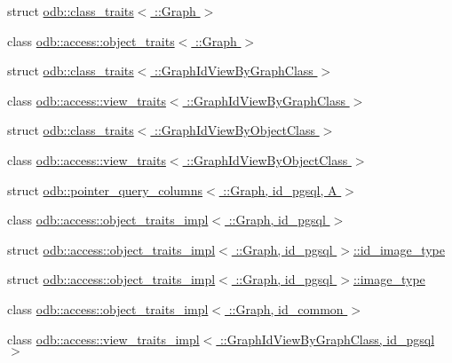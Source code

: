 \begin{DoxyCompactItemize}
\item 
struct \hyperlink{structodb_1_1class__traits_3_01_1_1_graph_01_4}{odb\+::class\+\_\+traits$<$ \+::\+Graph $>$}
\item 
class \hyperlink{classodb_1_1access_1_1object__traits_3_01_1_1_graph_01_4}{odb\+::access\+::object\+\_\+traits$<$ \+::\+Graph $>$}
\item 
struct \hyperlink{structodb_1_1class__traits_3_01_1_1_graph_id_view_by_graph_class_01_4}{odb\+::class\+\_\+traits$<$ \+::\+Graph\+Id\+View\+By\+Graph\+Class $>$}
\item 
class \hyperlink{classodb_1_1access_1_1view__traits_3_01_1_1_graph_id_view_by_graph_class_01_4}{odb\+::access\+::view\+\_\+traits$<$ \+::\+Graph\+Id\+View\+By\+Graph\+Class $>$}
\item 
struct \hyperlink{structodb_1_1class__traits_3_01_1_1_graph_id_view_by_object_class_01_4}{odb\+::class\+\_\+traits$<$ \+::\+Graph\+Id\+View\+By\+Object\+Class $>$}
\item 
class \hyperlink{classodb_1_1access_1_1view__traits_3_01_1_1_graph_id_view_by_object_class_01_4}{odb\+::access\+::view\+\_\+traits$<$ \+::\+Graph\+Id\+View\+By\+Object\+Class $>$}
\item 
struct \hyperlink{structodb_1_1pointer__query__columns_3_01_1_1_graph_00_01id__pgsql_00_01_a_01_4}{odb\+::pointer\+\_\+query\+\_\+columns$<$ \+::\+Graph, id\+\_\+pgsql, A $>$}
\item 
class \hyperlink{classodb_1_1access_1_1object__traits__impl_3_01_1_1_graph_00_01id__pgsql_01_4}{odb\+::access\+::object\+\_\+traits\+\_\+impl$<$ \+::\+Graph, id\+\_\+pgsql $>$}
\item 
struct \hyperlink{structodb_1_1access_1_1object__traits__impl_3_01_1_1_graph_00_01id__pgsql_01_4_1_1id__image__type}{odb\+::access\+::object\+\_\+traits\+\_\+impl$<$ \+::\+Graph, id\+\_\+pgsql $>$\+::id\+\_\+image\+\_\+type}
\item 
struct \hyperlink{structodb_1_1access_1_1object__traits__impl_3_01_1_1_graph_00_01id__pgsql_01_4_1_1image__type}{odb\+::access\+::object\+\_\+traits\+\_\+impl$<$ \+::\+Graph, id\+\_\+pgsql $>$\+::image\+\_\+type}
\item 
class \hyperlink{classodb_1_1access_1_1object__traits__impl_3_01_1_1_graph_00_01id__common_01_4}{odb\+::access\+::object\+\_\+traits\+\_\+impl$<$ \+::\+Graph, id\+\_\+common $>$}
\item 
class \hyperlink{classodb_1_1access_1_1view__traits__impl_3_01_1_1_graph_id_view_by_graph_class_00_01id__pgsql_01_4}{odb\+::access\+::view\+\_\+traits\+\_\+impl$<$ \+::\+Graph\+Id\+View\+By\+Graph\+Class, id\+\_\+pgsql $>$}

\end{DoxyCompactItemize}
